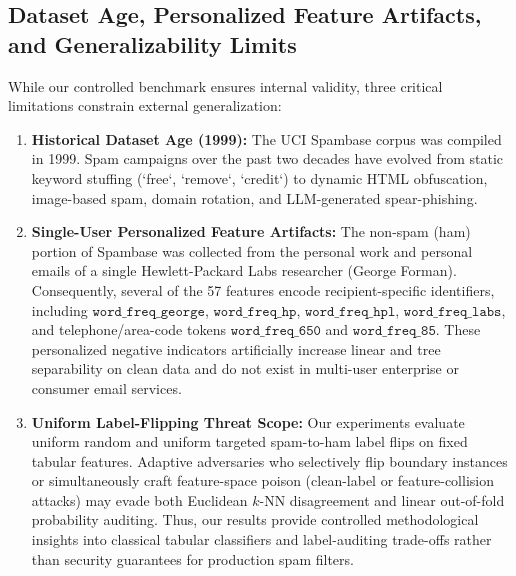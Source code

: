\documentclass[10pt,conference]{IEEEtran}
\begin{document}
\subsection{Dataset Age, Personalized Feature Artifacts, and Generalizability Limits}
While our controlled benchmark ensures internal validity, three critical limitations constrain external generalization:
\begin{enumerate}
    \item \textbf{Historical Dataset Age (1999):} The UCI Spambase corpus \cite{hopkins1999spambase} was compiled in 1999. Spam campaigns over the past two decades have evolved from static keyword stuffing (`free`, `remove`, `credit`) to dynamic HTML obfuscation, image-based spam, domain rotation, and LLM-generated spear-phishing.
    \item \textbf{Single-User Personalized Feature Artifacts:} The non-spam (ham) portion of Spambase was collected from the personal work and personal emails of a single Hewlett-Packard Labs researcher (George Forman). Consequently, several of the 57 features encode recipient-specific identifiers, including $\mathtt{word\_freq\_george}$, $\mathtt{word\_freq\_hp}$, $\mathtt{word\_freq\_hpl}$, $\mathtt{word\_freq\_labs}$, and telephone/area-code tokens $\mathtt{word\_freq\_650}$ and $\mathtt{word\_freq\_85}$. These personalized negative indicators artificially increase linear and tree separability on clean data and do not exist in multi-user enterprise or consumer email services.
    \item \textbf{Uniform Label-Flipping Threat Scope:} Our experiments evaluate uniform random and uniform targeted spam-to-ham label flips on fixed tabular features. Adaptive adversaries who selectively flip boundary instances or simultaneously craft feature-space poison (clean-label or feature-collision attacks) may evade both Euclidean $k$-NN disagreement and linear out-of-fold probability auditing. Thus, our results provide controlled methodological insights into classical tabular classifiers and label-auditing trade-offs rather than security guarantees for production spam filters.
\end{enumerate}
\end{document}
